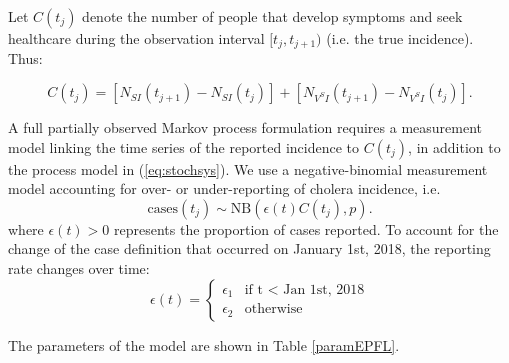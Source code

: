 Let \(C(t_j)\) denote the number of people that develop symptoms and seek healthcare during the
observation interval \([t_j, t_{j+1})\) (i.e. the true incidence). Thus:

\begin{equation}
    C(t_j) = [N_{SI}(t_{j+1}) - N_{SI}(t_j)] + [N_{V^SI}(t_{j+1}) - N_{V^SI}(t_j)].
\end{equation}

A full partially observed Markov process formulation requires a measurement model linking the time series of the reported incidence to \(C(t_j)\), in addition to the process model in (\ref{eq:stochsys}). We use a negative-binomial measurement model accounting for over- or under-reporting of cholera incidence, i.e.
\[
	\text{cases}(t_j) \sim \text{NB}(\epsilon(t) C(t_j), p).
\]
where \(\epsilon(t) > 0\) represents the proportion of cases reported. To account for the change of the case definition that occurred on January 1st, 2018, the reporting rate changes over time:
\begin{equation}
\epsilon(t) = \left\{
    \begin{array}{ll}
        \epsilon_1 & \mbox{if t $<$ Jan 1st, 2018} \\
        \epsilon_2 & \mbox{otherwise}
    \end{array}
\right.
\end{equation}

The parameters of the model are shown in Table \ref{paramEPFL}.




